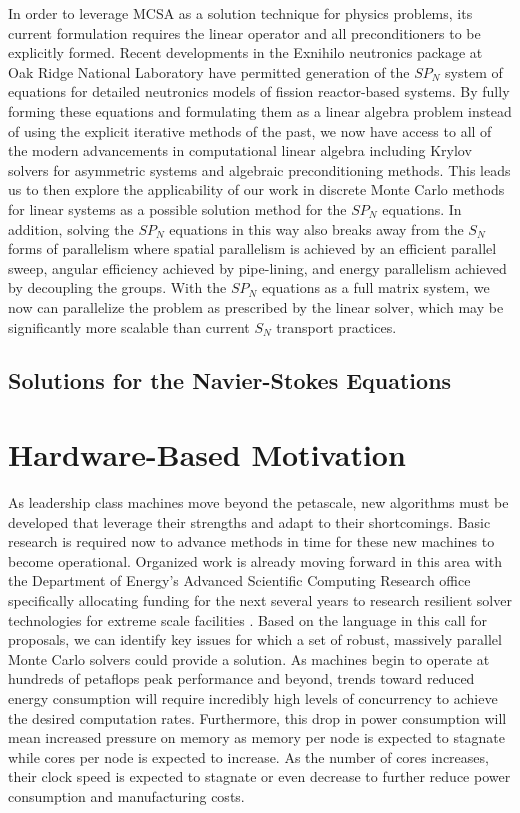 In order to leverage MCSA as a solution technique for physics
problems, its current formulation requires the linear operator and all
preconditioners to be explicitly formed. Recent developments in the
Exnihilo neutronics package at Oak Ridge National Laboratory have
permitted generation of the $SP_N$ system of equations for detailed
neutronics models of fission reactor-based
systems\citep{evans_simpli_2013}. By fully forming these equations and
formulating them as a linear algebra problem instead of using the
explicit iterative methods of the past, we now have access to all of
the modern advancements in computational linear algebra including
Krylov solvers for asymmetric systems and algebraic preconditioning
methods. This leads us to then explore the applicability of our work
in discrete Monte Carlo methods for linear systems as a possible
solution method for the $SP_N$ equations. In addition, solving the
$SP_N$ equations in this way also breaks away from the $S_N$ forms of
parallelism where spatial parallelism is achieved by an efficient
parallel sweep, angular efficiency achieved by pipe-lining, and energy
parallelism achieved by decoupling the groups. With the $SP_N$
equations as a full matrix system, we now can parallelize the problem
as prescribed by the linear solver, which may be significantly more
scalable than current $S_N$ transport practices.

\subsection{Solutions for the Navier-Stokes Equations}
\label{subsec:ns_motiviation}

\section{Hardware-Based Motivation}
\label{sec:hardware_motivation}
As leadership class machines move beyond the petascale, new algorithms
must be developed that leverage their strengths and adapt to their
shortcomings. Basic research is required now to advance methods in
time for these new machines to become operational. Organized work is
already moving forward in this area with the Department of Energy's
Advanced Scientific Computing Research office specifically allocating
funding for the next several years to research resilient solver
technologies for extreme scale facilities
\citep{u.s._department_of_energy_resilient_2012}. Based on the
language in this call for proposals, we can identify key issues for
which a set of robust, massively parallel Monte Carlo solvers could
provide a solution. As machines begin to operate at hundreds of
petaflops peak performance and beyond, trends toward reduced energy
consumption will require incredibly high levels of concurrency to
achieve the desired computation rates. Furthermore, this drop in power
consumption will mean increased pressure on memory as memory per node
is expected to stagnate while cores per node is expected to
increase. As the number of cores increases, their clock speed is
expected to stagnate or even decrease to further reduce power
consumption and manufacturing costs.

